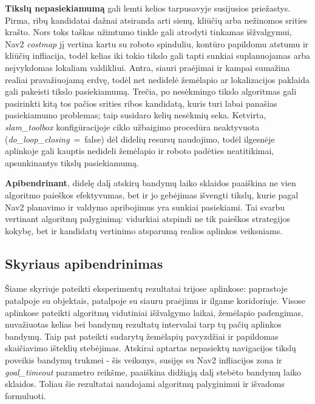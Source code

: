 \documentclass[]{VUMIFTemplateClass}
\begin{document}
\textbf{Tikslų nepasiekiamumą} gali lemti kelios tarpusavyje susijusios priežastys. Pirma, ribų kandidatai dažnai atsiranda arti sienų, kliūčių arba nežinomos srities
krašto. Nors toks taškas užimtumo tinkle gali atrodyti tinkamas išžvalgymui, Nav2 \textit{costmap} jį vertina kartu su roboto spinduliu, kontūro papildomu
atstumu ir kliūčių infliacija, todėl kelias iki tokio tikslo gali tapti sunkiai suplanuojamas arba neįvykdomas lokaliam valdikliui. Antra, siauri praėjimai ir
kampai sumažina realiai pravažiuojamą erdvę, todėl net nedidelė žemėlapio ar lokalizacijos paklaida gali pakeisti tikslo pasiekiamumą. Trečia, po nesėkmingo
tikslo algoritmas gali pasirinkti kitą tos pačios srities ribos kandidatą, kuris turi labai panašias pasiekiamumo problemas; taip susidaro kelių nesėkmių
seka. Ketvirta, \textit{slam\_toolbox} konfigūracijoje ciklo užbaigimo procedūra neaktyvuota (\textit{do\_loop\_closing}~=~false) dėl didelių resursų naudojimo, todėl ilgesnėje aplinkoje
gali kauptis nedideli žemėlapio ir roboto padėties neatitikimai, apsunkinantys tikslų pasiekiamumą.

\textbf{Apibendrinant}, didelę dalį atskirų bandymų laiko sklaidos paaiškina ne vien algoritmo paieškos efektyvumas, bet ir jo gebėjimas išvengti tikslų, kurie pagal
Nav2 planavimo ir valdymo apribojimus yra sunkiai pasiekiami. Tai svarbu vertinant algoritmų palyginimą: vidurkiai atspindi ne tik paieškos strategijos
kokybę, bet ir kandidatų vertinimo atsparumą realios aplinkos veiksniams.

\subsection{Skyriaus apibendrinimas}

Šiame skyriuje pateikti eksperimentų rezultatai trijose aplinkose: paprastoje patalpoje su objektais, patalpoje su siauru praėjimu ir ilgame koridoriuje.
Visose aplinkose pateikti algoritmų vidutiniai išžvalgymo laikai, žemėlapio padengimas, nuvažiuotas kelias bei bandymų rezultatų intervalai tarp tų pačių aplinkos
bandymų. Taip pat pateikti sudarytų žemėlapių pavyzdžiai ir papildomas skaičiavimo išteklių stebėjimas. Atskirai aptartas nepasiektų navigacijos tikslų
poveikis bandymų trukmei - šis veiksnys, susijęs su Nav2 infliacijos zona ir \textit{goal\_timeout} parametro reikšme, paaiškina didžiąją dalį stebėto
bandymų laiko sklaidos. Toliau šie rezultatai naudojami algoritmų palyginimui ir išvadoms formuluoti.

\end{document}
